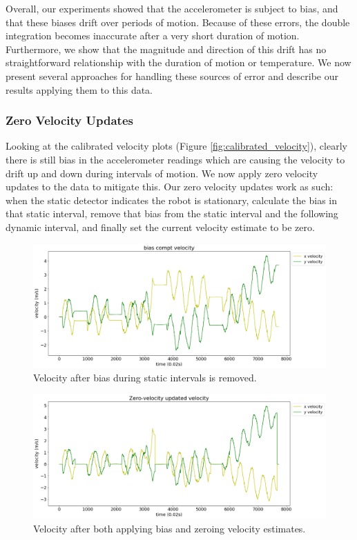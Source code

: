 \documentclass{article}
\begin{document}
      Overall, our experiments showed that the accelerometer is subject to bias, and that these biases drift over periods of motion. Because of these errors, the double integration becomes inaccurate after a very short duration of motion. Furthermore, we show that the magnitude and direction of this drift has no straightforward relationship with the duration of motion or temperature. We now present several approaches for handling these sources of error and describe our results applying them to this data.

    \subsubsection{Zero Velocity Updates} \label{section:zero_velocity_updates}

      Looking at the calibrated velocity plots (Figure \ref{fig:calibrated_velocity}), clearly there is still bias in the accelerometer readings which are causing the velocity to drift up and down during intervals of motion. We now apply zero velocity updates to the data to mitigate this. Our zero velocity updates work as such: when the static detector indicates the robot is stationary, calculate the bias in that static interval, remove that bias from the static interval and the following dynamic interval, and finally set the current velocity estimate to be zero. %

      \begin{figure}[H]
        \centering
        \includegraphics[width=1\linewidth]{./images/bias-compt-velocity.png}
        \caption{Velocity after bias during static intervals is removed.}
        \label{fig:bias-removed}
      \end{figure}

      \begin{figure}[H]
        \centering
        \includegraphics[width=1\linewidth]{./images/zeroed-velocity.png}
        \caption{Velocity after both applying bias and zeroing velocity estimates.}
        \label{fig:zeroed_velocity}
      \end{figure}
\end{document}
